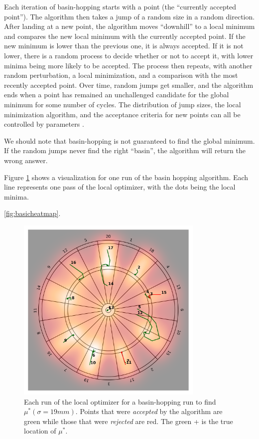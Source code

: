 \documentclass[]{article}
\newcommand{\mustar}{\ensuremath{\mu^* }}
\begin{document}
Each iteration of basin-hopping starts with a point (the ``currently accepted point''). The algorithm then takes a jump of a random size in a random direction. After landing at  a new point, the algorithm  moves ``downhill'' to a local minimum and compares the new local minimum with the currently accepted point. If the new minimum is lower than the previous one, it is always accepted. If it is not lower, there is a random process to decide whether or not to accept it, with lower minima being more likely to be accepted. The process then repeats, with another random perturbation, a local minimization, and a comparison with the most recently accepted point. Over time, random jumps get smaller, and the algorithm ends when a point has remained an unchallenged candidate for the global minimum for some number of cycles. The distribution of jump sizes, the local minimization algorithm, and the acceptance criteria for new points can all be controlled by parameters \cite{basin}.

We should note that basin-hopping is not guaranteed to find the global minimum. If the random jumps never find the right ``basin'', the algorithm will return the wrong answer. 

Figure \ref{fig:basin} shows a visualization for one run of the basin hopping algorithm. Each line represents one pass of the local optimizer, with the dots being the local minima. 


 \ref{fig:basicheatmap}.
\begin{figure}[h!]
	\centering
	\includegraphics[width=0.8\textwidth]{../images/sig19basin.png}
	\caption{Each run of the local optimizer for a basin-hopping run to find $\mustar(\sigma=19mm)$.  Points that were \textit{accepted} by the algorithm are green while those that were \textit{rejected} are red. The green + is the true location of \mustar.}
	\label{fig:basin}
\end{figure}
\end{document}
